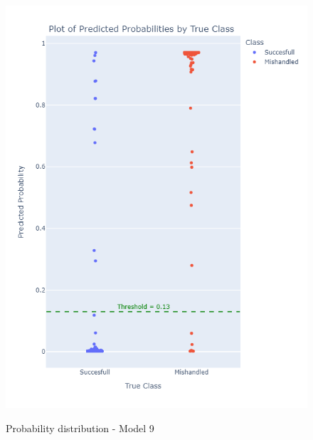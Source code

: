 \documentclass[12pt]{article}
\begin{document}
\begin{figure}
\begin{minipage}[c]{0.4\linewidth}
    \includegraphics[width=1\textwidth]{Probability_distribution_Model 9.png}\\
    \caption{Probability distribution - Model 9}
\end{minipage}
\end{figure}
\end{document}
